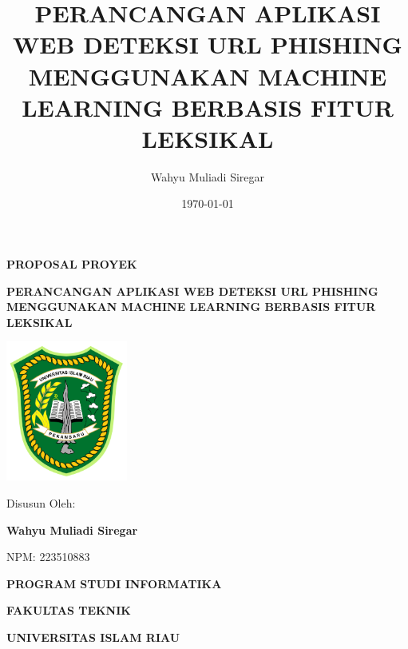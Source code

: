 \documentclass[12pt,a4paper]{report}
\title{PERANCANGAN APLIKASI WEB DETEKSI URL PHISHING MENGGUNAKAN MACHINE LEARNING BERBASIS FITUR LEKSIKAL}
\author{Wahyu Muliadi Siregar}
\date{\today}
\begin{document}

\begin{titlepage}
    \centering
    \vspace*{2cm}
    
    {\fontsize{14}{16}\selectfont\bfseries PROPOSAL PROYEK\par}
    \vspace{1.5cm}
    
    {\fontsize{14}{16}\selectfont\bfseries PERANCANGAN APLIKASI WEB DETEKSI URL PHISHING MENGGUNAKAN MACHINE LEARNING BERBASIS FITUR LEKSIKAL\par}
    \vspace{2cm}
    
    \includegraphics[width=0.3\textwidth]{logo-universitas.png}
    \vspace{1cm}
    
    {\fontsize{14}{16}\selectfont Disusun Oleh:\par}
    \vspace{0.5cm}
    {\fontsize{14}{16}\selectfont\bfseries Wahyu Muliadi Siregar\par}
    {\fontsize{14}{16}\selectfont NPM: 223510883\par}
    \vspace{2cm}
    
    {\fontsize{14}{16}\selectfont\bfseries PROGRAM STUDI INFORMATIKA\par}
    {\fontsize{14}{16}\selectfont\bfseries FAKULTAS TEKNIK\par}
    {\fontsize{14}{16}\selectfont\bfseries UNIVERSITAS ISLAM RIAU\par}
    {\fontsize{14}{16}\selectfont\bfseries \the\year\par}
\end{titlepage}
\restoregeometry %

\tableofcontents
\restoregeometry
\newpage





\end{document}

